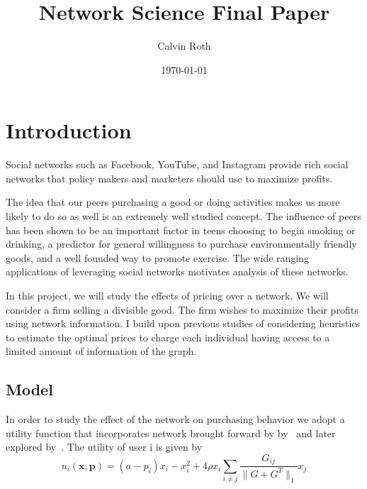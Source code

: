\documentclass[12pt]{article}
\author{Calvin Roth}
\date{\today}
\title{Network Science Final Paper}
\newcommand{\tb}[1]{\textbf{#1}}
\begin{document}
\maketitle
{}

\section{Introduction}

Social networks such as Facebook, YouTube, and Instagram provide rich social networks that policy makers and marketers should use to maximize profits.

The idea that our peers purchasing a good or doing activities makes us more likely to do so as well is an extremely well studied concept. The influence of peers has been shown to be an important factor in teens choosing to begin smoking or drinking\cite{urberg1997close}, a predictor for general willingness to purchase environmentally friendly goods\cite{dagher2012influence}, and a well founded way to promote exercise\cite{SocialInfluenceandExerciseAMetaAnalysis}. The wide ranging applications of leveraging social networks motivates analysis of these networks.

In this project, we will study the effects of pricing over a network. We will consider a firm selling a divisible good. The firm wishes to maximize their profits using network information. I build upon previous studies of considering heuristics to estimate the optimal prices to charge each individual having access to a limited amount of information of the graph.
\subsection{Model}
In order to study the effect of the network on purchasing behavior we adopt a utility function that incorporates network brought forward by by~\cite{candogan2012optimal} and later explored by~\cite{huang2021value}. The utility of user i is given by
\begin{equation}
   u_{i}(\tb{x}, \tb{p}) = (a-p_{i})x_{i} - x_{i}^{2} + 4 \rho x_{i} \sum_{i\neq j} \frac{G_{ij}}{\| G + G^{T}\|_{1}} x_{j}
 \end{equation}
\end{document}
